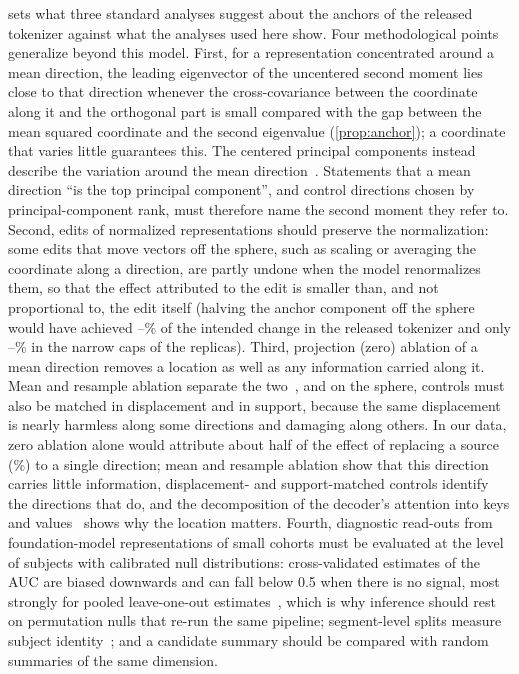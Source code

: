 \documentclass[10pt,letterpaper]{article}
\begin{document}
 sets what three standard analyses suggest about the anchors of the released
tokenizer against what the analyses used here show. Four methodological points generalize beyond
this model. First, for a representation concentrated
around a mean direction, the leading eigenvector of the uncentered second moment lies close to that
direction whenever the cross-covariance between the coordinate along it and the orthogonal part is
small compared with the gap between the mean squared coordinate and the second eigenvalue
(\cref{prop:anchor}); a coordinate that varies little guarantees this. The centered principal
components instead describe the variation around the mean direction~\cite{mu2018allbutthetop,honeine2014centering}. Statements that a mean direction ``is the top
principal component'', and control directions chosen by principal-component rank, must therefore
name the second moment they refer to. Second,
edits of normalized representations should preserve the normalization: some edits that move
vectors off the sphere, such as scaling or averaging the coordinate along a direction, are partly
undone when the model renormalizes them, so that the effect attributed to the edit is smaller than,
and not proportional to, the edit itself (halving the anchor component off the sphere would have
achieved \OffSphereHalfMin--\OffSphereHalfMax\% of the intended change in the released tokenizer
and only \RepOffSphereHalfMin--\RepOffSphereHalfMax\% in the narrow caps of the replicas). Third, projection (zero) ablation of a mean direction
removes a location as well as any information carried along it. Mean and resample ablation
separate the two~\cite{chan2022causalscrubbing,heimersheim2024patching,zhang2024bestpractices,
li2024optimalablation}, and on the sphere, controls must also be matched in displacement and in
support, because the same displacement is nearly harmless along some directions and damaging along
others. In our data, zero ablation alone would attribute about half of the effect of replacing a
source (\ZeroOverSourceMedianPct\%) to a single direction; mean and resample ablation show that this direction carries little information,
displacement- and support-matched controls identify the directions that do, and the decomposition
of the decoder's attention into keys and values~\cite{elhage2021framework} shows why the location
matters. Fourth, diagnostic read-outs from foundation-model representations of small cohorts must
be evaluated at the level of subjects with calibrated null distributions: cross-validated
estimates of the AUC are biased downwards and can fall below 0.5 when there is no signal, most
strongly for pooled leave-one-out estimates~\cite{parker2007stratification,airola2011auc}, which is
why inference should rest on permutation nulls that re-run the same pipeline; segment-level splits measure subject identity~\cite{saeb2017usecase,lin2026identitytrap}; and a candidate summary should be compared with
random summaries of the same dimension.
\end{document}
